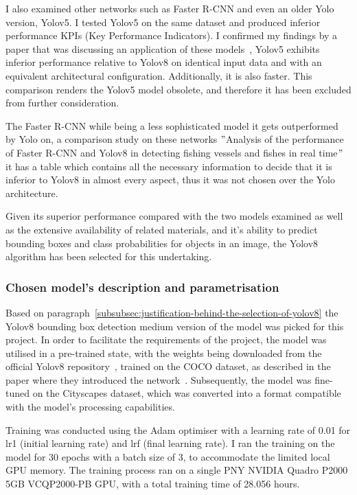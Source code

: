 I also examined other networks such as Faster R-CNN and even an older Yolo version, Yolov5.
I tested Yolov5 on the same dataset and produced inferior performance KPIs (Key Performance Indicators).
I confirmed my findings by a paper that was discussing an application of these models~\cite{Chitraningrum_Banowati_Herdiana_Mulyati_Sakti_Fudholi_Saputra_Farishi_Muchtar_Andria_2024},
Yolov5 exhibits inferior performance relative to Yolov8 on identical input data and with an equivalent architectural configuration.
Additionally, it is also faster.
This comparison renders the Yolov5 model obsolete, and therefore it has been excluded from further consideration.

The Faster R-CNN while being a less sophisticated model it gets outperformed by Yolo on,
a comparison study on these networks \("\)Analysis of the performance of Faster R-CNN and Yolov8 in detecting fishing vessels and fishes in real time\("\)~\cite{ezzeddini2024fishing}
it has a table which contains all the necessary information to decide that it is inferior to Yolov8 in almost every aspect, thus it was not chosen over the Yolo architecture.

Given its superior performance compared with the two models examined
as well as the extensive availability of related materials, and it's ability to predict bounding boxes and class
probabilities for objects in an image, the Yolov8 algorithm has been selected for this undertaking.

\subsubsection{Chosen model's description and parametrisation}\label{subsubsec:model-architecture}

Based on paragraph~\ref{subsubsec:justification-behind-the-selection-of-yolov8} the Yolov8 bounding box
detection medium version of the model was picked for this project.
In order to facilitate the requirements of the project, the model was utilised in a pre-trained state,
with the weights being downloaded from the official Yolov8 repository~\cite{githubGitHubUltralyticsultralytics}, trained on the COCO dataset, as described in the paper where they introduced the network~\cite{redmon2016lookonceunifiedrealtime}.
Subsequently, the model was fine-tuned on the Cityscapes dataset, which was converted into a format compatible with the model's processing capabilities.

Training was conducted using the Adam optimiser with a learning rate of 0.01 for lr1 (initial learning rate) and lrf (final learning rate).
I ran the training on the model for 30 epochs with a batch size of 3, to accommodate the limited local GPU memory.
The training process ran on a single PNY NVIDIA Quadro P2000 5GB VCQP2000-PB GPU, with a total training time of 28.056 hours.

